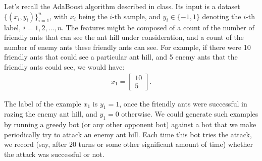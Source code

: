 \documentclass[10pt]{article}
\begin{document}
\begin{enumerate}
	      Let’s recall the AdaBoost algorithm described in class. Its input is a dataset $\{(x_{i},y_{i})\}_{i=1}^{n}$, with $x_i$ being the $i$-th sample, and $y_{i}\in \{-1,1\}$ denoting the $i$-th label, $i=1,2,...,n$. The features might be composed of a count of the number of friendly ants that can see the ant hill under consideration, and a count of the number of enemy ants these friendly ants can see. For example, if there were 10 friendly ants that could see a particular ant hill, and 5 enemy ants that the friendly ants could see, we would have:
	      \begin{align*}
		      x_1 = \begin{bmatrix}
			      10 \\
			      5
		      \end{bmatrix}.
	      \end{align*}

	      The label of the example $x_{1}$ is $y_{1} = 1$, once the friendly ants were successful in razing the enemy ant hill, and $y_{1} = 0$ otherwise. We could generate such examples by running a greedy bot (or any other opponent bot) against a bot that we make periodically try to attack an enemy ant hill. Each time this bot tries the attack, we record (say, after $20$ turns or some other significant amount of time) whether the attack was successful or not.


\end{enumerate}
\end{document}

